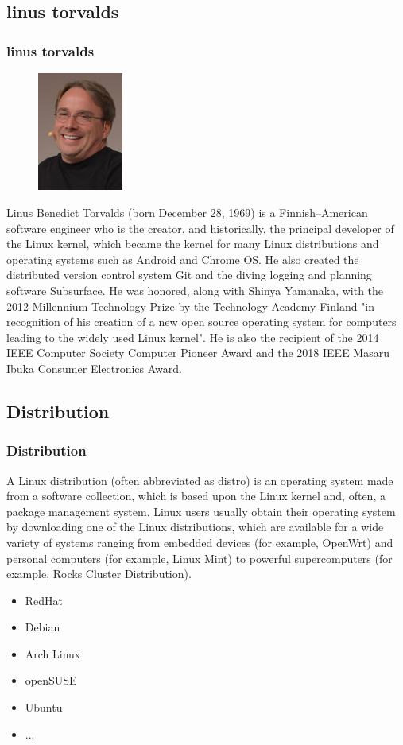 \documentclass{beamer}
\begin{document}
\subsection{linus torvalds}
\begin{frame}
\frametitle{linus torvalds}


\begin{figure}
    \centering
    \includegraphics[width=0.25\textwidth]{Linus_Torvalds.jpg}
\end{figure}
\small Linus Benedict Torvalds (born December 28, 1969) is a Finnish–American software engineer who is the creator, and historically, the principal developer of the Linux kernel, which became the kernel for many Linux distributions and operating systems such as Android and Chrome OS. He also created the distributed version control system Git and the diving logging and planning software Subsurface. He was honored, along with Shinya Yamanaka, with the 2012 Millennium Technology Prize by the Technology Academy Finland "in recognition of his creation of a new open source operating system for computers leading to the widely used Linux kernel". He is also the recipient of the 2014 IEEE Computer Society Computer Pioneer Award and the 2018 IEEE Masaru Ibuka Consumer Electronics Award.
\end{frame}

\subsection{Distribution}
\begin{frame}
\frametitle{Distribution}
A Linux distribution (often abbreviated as distro) is an operating system made from a software collection, which is based upon the Linux kernel and, often, a package management system. Linux users usually obtain their operating system by downloading one of the Linux distributions, which are available for a wide variety of systems ranging from embedded devices (for example, OpenWrt) and personal computers (for example, Linux Mint) to powerful supercomputers (for example, Rocks Cluster Distribution).
\begin{itemize}
\item RedHat
\item Debian
\item Arch Linux
\item openSUSE
\item Ubuntu
\item ...
\end{itemize}
\end{frame}
\end{document}
